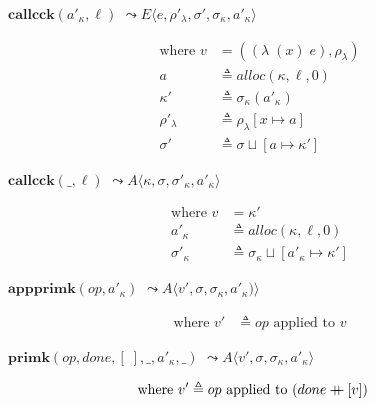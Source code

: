 \documentclass[12pt,draft]{article}
\newcommand\mdoubleplus{\ensuremath{\mathbin{+\mkern-9mu+}}}
\newcommand{\singlelamsyn}[2]{(\lambda\;(#1)\;#2)}
\begin{document}
\begin{multicols*}{2}
\begin{center}
  $\textbf{callcck}(a'_\kappa, \ell)$
  $\leadsto E\langle e , \rho'_\lambda , \sigma' , \sigma_\kappa , a'_\kappa \rangle$
\end{center}
\vspace{-7mm}
\begin{align*}
  \text{where } v &= (\singlelamsyn{x}{e} , \rho_{\lambda}) \\
  a &\triangleq alloc(\kappa, \ell, 0) \\
  \kappa' &\triangleq \sigma_\kappa(a'_\kappa) \\
  \rho'_{\lambda} &\triangleq \rho_{\lambda}[x \mapsto a] \\
  \sigma' &\triangleq \sigma \sqcup [a \mapsto \kappa']
\end{align*}
\begin{center}
  $\textbf{callcck}(\_, \ell)$
  $\leadsto A\langle \kappa , \sigma , \sigma'_\kappa , a'_\kappa  \rangle$
\end{center}
\vspace{-7mm}
\begin{align*}
  \text{where }
  v &= \kappa' \\
  a'_\kappa &\triangleq alloc(\kappa, \ell, 0) \\
  \sigma'_\kappa &\triangleq \sigma_\kappa \sqcup [a'_\kappa \mapsto \kappa']
\end{align*}
\begin{center}
  $\textbf{appprimk}(op, a'_\kappa)$
  $\leadsto A\langle v' , \sigma , \sigma_\kappa , a'_\kappa) \rangle$
\end{center}
\vspace{-7mm}
\begin{align*}
\text{where } v' &\triangleq op \text{ applied to } v
\end{align*}
\begin{center}
  $\textbf{primk}(op, done, [\;], \_, a'_\kappa, \_)$
  $\leadsto A\langle v' , \sigma , \sigma_\kappa , a'_\kappa \rangle$
\end{center}
\vspace{-7mm}
\begin{align*}
\text{where } v' &\triangleq op \text{ applied to } (done \mdoubleplus [v])
\end{align*}

\end{multicols*}
\end{document}
